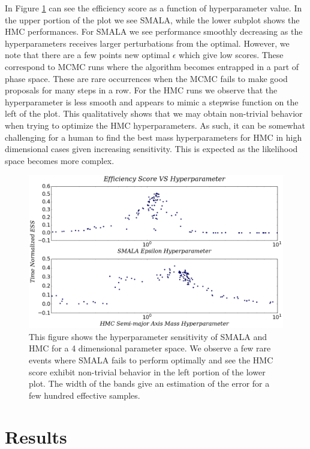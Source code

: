 \documentclass{aa}
\begin{document}
In Figure \ref{sensfig} can see the efficiency score as a function of hyperparameter value. In the upper portion of the plot we see SMALA, while the lower subplot shows the HMC performances. For SMALA we see performance smoothly decreasing as the hyperparameters receives larger perturbations from the optimal. However, we note that there are a few points new optimal $\epsilon$ which give low scores. These correspond to MCMC runs where the algorithm becomes entrapped in a part of phase space. These are rare occurrences when the MCMC fails to make good proposals for many steps in a row. For the HMC runs we observe that the hyperparameter is less smooth and appears to mimic a stepwise function on the left of the plot. This qualitatively shows that we may obtain non-trivial behavior when trying to optimize the HMC hyperparameters. As such, it can be somewhat challenging for a human to find the best mass hyperparameters for HMC in high dimensional cases given increasing sensitivity. This is expected as the likelihood space becomes more complex.

\begin{figure}
\centering
\includegraphics[width=0.95\hsize]{sensitivity-1.png}
   \caption{This figure shows the hyperparameter sensitivity of SMALA and HMC for a 4 dimensional parameter space. We observe a few rare events where SMALA fails to perform optimally and see the HMC score exhibit non-trivial behavior in the left portion of the lower plot. The width of the bands give an estimation of the error for a few hundred effective samples.}
      \label{sensfig}
\end{figure}

\section{Results}\label{results}
\end{document}

